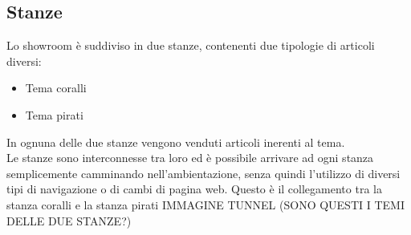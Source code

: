 \subsection{Stanze}
Lo showroom è suddiviso in due stanze, contenenti due tipologie di articoli diversi:
\begin{itemize}
	\item Tema coralli
	\item Tema pirati
\end{itemize}
In ognuna delle due stanze vengono venduti articoli inerenti al tema.\\
Le stanze sono interconnesse tra loro ed è possibile arrivare ad ogni stanza semplicemente camminando nell'ambientazione, senza quindi l'utilizzo di diversi tipi di navigazione o di cambi di pagina web.
Questo è il collegamento tra la stanza coralli e la stanza pirati
IMMAGINE TUNNEL (SONO QUESTI I TEMI DELLE DUE STANZE?)

\pagebreak


